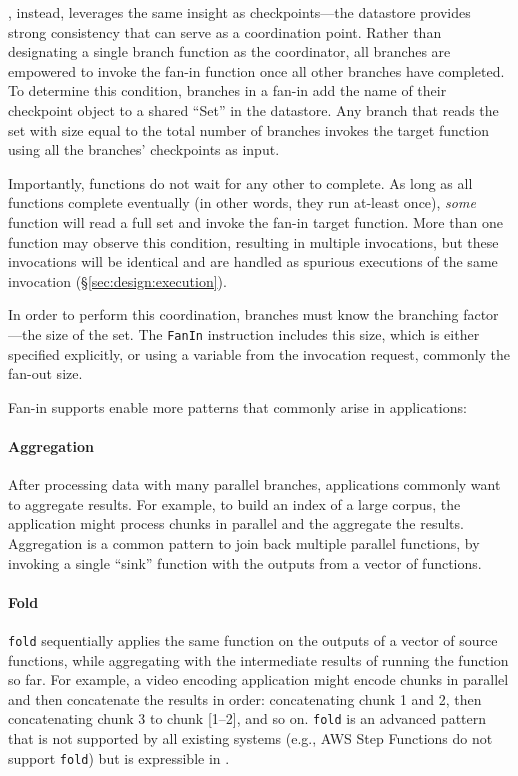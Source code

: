 \name{}, instead, leverages the same insight as checkpoints---the datastore
provides strong consistency that can serve as a coordination point. Rather
than designating a single branch function as the coordinator, all branches are
empowered to invoke the fan-in function once all other branches have
completed. To determine this condition, branches in a fan-in add the name of
their checkpoint object to a shared ``Set'' in the datastore. Any branch that
reads the set with size equal to the total number of branches invokes the
target function using all the branches' checkpoints as input.

Importantly, functions do not wait for any other to complete. As long as all
functions complete eventually (in other words, they run at-least once),
\emph{some} function will read a full set and invoke the fan-in target function.
More than one function may observe this condition, resulting in multiple
invocations, but these invocations will be identical and are handled as spurious
executions of the same invocation (\S\ref{sec:design:execution}).

In order to perform this coordination, branches must know the branching
factor---the size of the set. The \texttt{FanIn} instruction includes this size,
which is either specified explicitly, or using a variable from the invocation
request, commonly the fan-out size.


Fan-in supports enable more patterns that commonly arise in applications:

\paragraph{Aggregation}
After processing data with many parallel branches, applications commonly want to
aggregate results. For example, to build an index of a large corpus, the
application might process chunks in parallel and the aggregate the results.
Aggregation is a common pattern to join back multiple parallel functions, by
invoking a single ``sink'' function with the outputs from a vector of functions.

\paragraph{Fold}
\texttt{fold} sequentially applies the same function on the outputs of a vector
of source functions, while aggregating with the intermediate results of running
the function so far. For example, a video encoding application might encode
chunks in parallel and then concatenate the results in order: concatenating
chunk 1 and 2, then concatenating chunk 3 to chunk [1--2], and so on.
\texttt{fold} is an advanced pattern that is not supported by all existing
systems (e.g., AWS Step Functions do not support \texttt{fold}) but is
expressible in \name{}.



